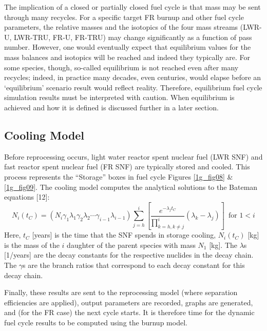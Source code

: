 The implication of a closed or partially closed fuel cycle is that mass may be sent through many recycles.  
For a specific target FR burnup and other fuel cycle parameters, the relative masses and the isotopics of 
the four mass streams (LWR-U, LWR-TRU, FR-U, FR-TRU) may change significantly as a function of pass number.  
However, one would eventually expect that equilibrium values for the mass balances and isotopics will be 
reached and indeed they typically are.  For some species, though, so-called equilibrium is not reached 
even after many recycles; indeed, in practice many decades, even centuries, would elapse before an 
`equilibrium' scenario result would reflect reality.  Therefore, equilibrium fuel cycle simulation 
results must be interpreted with caution.  When equilibrium is achieved and how it is defined is discussed 
further in a later section.  



\subsection{Cooling Model}
\label{1g_sec:cool_model}
Before reprocessing occurs, light water reactor spent nuclear fuel (LWR SNF) and fast reactor spent 
nuclear fuel (FR SNF) are typically stored and cooled.  This process represents the ``Storage'' boxes in 
fuel cycle Figures \ref{1g_fig08} \& \ref{1g_fig09}.  The cooling model computes the analytical solutions 
to the Bateman equations [12]: 
\begin{equation}
\label{1g_bateman}
N_i(t_C) = \left( N_i\gamma_1\lambda_1\gamma_2\lambda_2\cdots\gamma_{i-1}\lambda_{i-1} \right)
            \sum_{j=h}^i \left[\frac{e^{-\lambda_j t_C}}{\prod_{k=h, k\ne j}^i} (\lambda_k - \lambda_j) \right] \, \mbox{ for } 1 < i
\end{equation}
Here, $t_C$ [years] is the time that the SNF spends in storage cooling,  $N_i(t_C)$ [kg] is the 
mass of the $i$ daughter of the parent species with mass $N_1$ [kg]. The $\lambda$s [1/years] 
are the decay constants for the respective nuclides in the decay chain.   The $\gamma$s are the branch ratios 
that correspond to each decay constant for this decay chain.  

Finally, these results are sent to the reprocessing model (where separation efficiencies are applied), output 
parameters are recorded, graphs are generated, and (for the FR case) the next cycle starts.   It is therefore 
time for the dynamic fuel cycle results to be computed using the burnup model.






